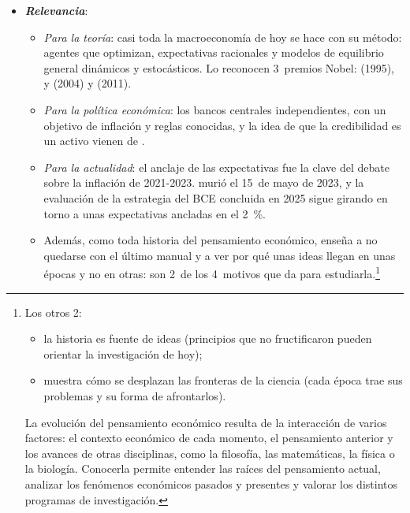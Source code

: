 \documentclass[11pt]{article}
\begin{document}
\begin{itemize}
\item \textbf{\emph{Relevancia}}:
  \begin{itemize}
  \item \emph{Para la teoría}: casi toda la macroeconomía de hoy se hace con su método: agentes que optimizan, expectativas racionales y modelos de equilibrio general dinámicos y estocásticos\nocite{DeVroey2016History}. Lo reconocen 3~premios Nobel:  (1995),  y  (2004) y  (2011).
  \item \emph{Para la política económica}: los bancos centrales independientes, con un objetivo de inflación y reglas conocidas, y la idea de que la credibilidad es un activo vienen de \textcite{KydlandPrescott1977Rules} .
  \item \emph{Para la actualidad}: el anclaje de las expectativas fue la clave del debate sobre la inflación de 2021-2023.  murió el 15~de mayo de 2023\nocite{NobelPrize2026LucasDatos}, y la evaluación de la estrategia del BCE concluida en 2025 sigue girando en torno a unas expectativas ancladas en el 2~\%\nocite{BCE2025Estrategia}.
  \item Además, como toda historia del pensamiento económico, enseña a no quedarse con el último manual y a ver por qué unas ideas llegan en unas épocas y no en otras: son 2~de los 4~motivos que da  para estudiarla\nocite{Schumpeter1954History}.\footnote{Los otros 2:
\begin{itemize}
\item la historia es fuente de ideas (principios que no fructificaron pueden orientar la investigación de hoy);
\item muestra cómo se desplazan las fronteras de la ciencia (cada época trae sus problemas y su forma de afrontarlos).
\end{itemize}
La evolución del pensamiento económico resulta de la interacción de varios factores: el contexto económico de cada momento, el pensamiento anterior y los avances de otras disciplinas, como la filosofía, las matemáticas, la física o la biología. Conocerla permite entender las raíces del pensamiento actual, analizar los fenómenos económicos pasados y presentes y valorar los distintos programas de investigación.}
  \end{itemize}


\end{itemize}
\end{document}
